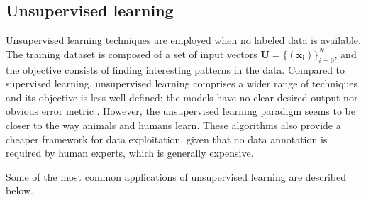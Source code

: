 \subsection{Unsupervised learning}
Unsupervised learning techniques are employed when no labeled data is available. The training dataset is composed of a set of input vectors $\mathbf{U}=\{(\mathbf{x_i})\}_{i=0}^{N}$, and the objective consists of finding interesting patterns in the data. Compared to supervised learning, unsupervised learning comprises a wider range of techniques and its objective is less well defined: the models have no clear desired output nor obvious error metric \autocite{Goodfellow2016}. However, the unsupervised learning paradigm seems to be closer to the way animals and humans learn. These algorithms also provide a cheaper framework for data exploitation, given that no data annotation is required by human experts, which is generally expensive.

Some of the most common applications of unsupervised learning are described below.

